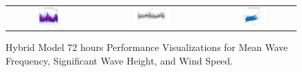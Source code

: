 \begin{figure}[ht!]
\begin{tabular}{ccc}
    \includegraphics[width=0.32\textwidth]{graphs/hybrid/72 hours/wind_speed/actual vs forecast.jpg} &
    \includegraphics[width=0.32\textwidth]{graphs/hybrid/72 hours/wind_speed/residuals.jpg} &
    \includegraphics[width=0.32\textwidth]{graphs/hybrid/72 hours/wind_speed/scatter plot.jpg} \\
  \end{tabular}
  \caption{Hybrid Model 72 hours Performance Visualizations for Mean Wave Frequency, Significant Wave Height, and Wind Speed.}
  \label{fig:hybrid_72_hours}
\end{figure}

